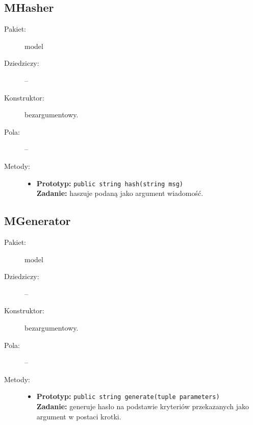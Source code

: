 \documentclass[a4paper]{article}
\newcommand{\prog}{\texttt}
\begin{document}
\subsection{MHasher}
\begin{description}
    \item[Pakiet:] model
    \item[Dziedziczy:] --
    \item[Konstruktor:] bezargumentowy.
    \item[Pola:] \hfill --
    \begin{itemize}

    \end{itemize}
    \item[Metody:] \hfill
    \begin{itemize}
        \item \textbf{Prototyp:} \prog{public string hash(string msg)}\\\textbf{Zadanie:} haszuje podaną jako argument wiadomość.
    \end{itemize}
\end{description}

\subsection{MGenerator}
\begin{description}
    \item[Pakiet:] model
    \item[Dziedziczy:] --
    \item[Konstruktor:] bezargumentowy.
    \item[Pola:] \hfill --
    \begin{itemize}

    \end{itemize}
    \item[Metody:] \hfill
    \begin{itemize}
        \item \textbf{Prototyp:} \prog{public string generate(tuple parameters)}\\\textbf{Zadanie:} generuje hasło na podstawie kryteriów przekazanych jako argument w postaci krotki.
    \end{itemize}
\end{description}
\end{document}
